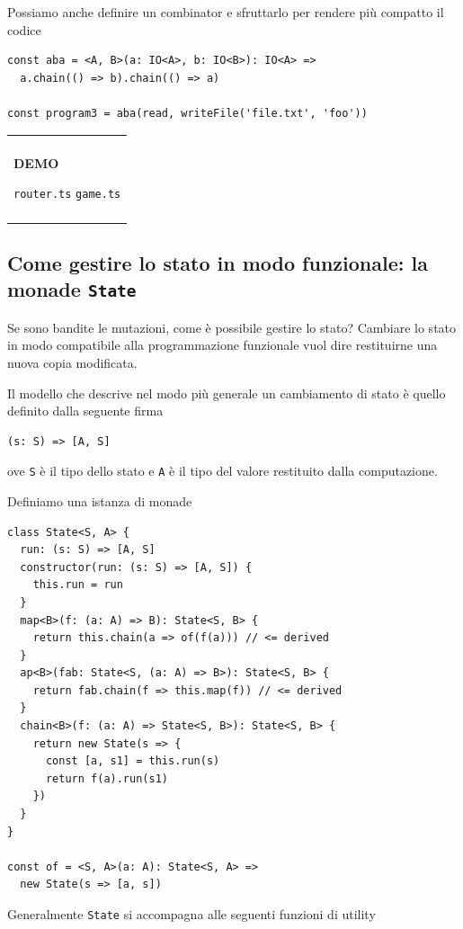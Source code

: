 \documentclass[12pt]{article}
\newenvironment{boxed}
    {\begin{center}
    \begin{tabular}{|p{0.9\textwidth}|}
    \hline\\
    }
    {
    \\\\\hline
    \end{tabular}
    \end{center}
    }
\begin{document}
Possiamo anche definire un combinator e sfruttarlo per rendere più compatto il codice

\begin{verbatim}
const aba = <A, B>(a: IO<A>, b: IO<B>): IO<A> =>
  a.chain(() => b).chain(() => a)

const program3 = aba(read, writeFile('file.txt', 'foo'))
\end{verbatim}

\begin{boxed}
\begin{center}
\textbf{DEMO}

\texttt{router.ts}
\texttt{game.ts}
\end{center}
\end{boxed}

\subsection{Come gestire lo stato in modo funzionale: la monade \texttt{State}}

Se sono bandite le mutazioni, come è possibile gestire lo stato?
Cambiare lo stato in modo compatibile alla programmazione funzionale vuol dire restituirne una nuova copia modificata.

Il modello che descrive nel modo più generale un cambiamento di stato è quello definito dalla seguente firma

\begin{verbatim}
(s: S) => [A, S]
\end{verbatim}

ove \texttt{S} è il tipo dello stato e \texttt{A} è il tipo del valore restituito dalla computazione.

Definiamo una istanza di monade

\begin{verbatim}
class State<S, A> {
  run: (s: S) => [A, S]
  constructor(run: (s: S) => [A, S]) {
    this.run = run
  }
  map<B>(f: (a: A) => B): State<S, B> {
    return this.chain(a => of(f(a))) // <= derived
  }
  ap<B>(fab: State<S, (a: A) => B>): State<S, B> {
    return fab.chain(f => this.map(f)) // <= derived
  }
  chain<B>(f: (a: A) => State<S, B>): State<S, B> {
    return new State(s => {
      const [a, s1] = this.run(s)
      return f(a).run(s1)
    })
  }
}

const of = <S, A>(a: A): State<S, A> =>
  new State(s => [a, s])
\end{verbatim}

Generalmente \texttt{State} si accompagna alle seguenti funzioni di utility
\end{document}
